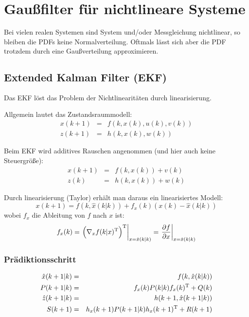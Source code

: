 \chapter{Gaußfilter für nichtlineare Systeme}
Bei vielen realen Systemen sind System und/oder Messgleichung nichtlinear, so bleiben die PDFs keine Normalverteilung. Oftmals lässt sich aber die PDF trotzdem durch eine Gaußverteilung
approximieren.

\section{Extended Kalman Filter (EKF)}
Das EKF löst das Problem der Nichtlinearitäten durch linearisierung.

Allgemein lautet das Zustandsraummodell:
\begin{eqnarray*}
    x(k+1) &=& f(k, x(k), u(k), v(k)) \\
    z(k+1) &=& h(k, x(k), w(k))
\end{eqnarray*}

Beim EKF wird additives Rauschen angenommen (und hier auch keine Steuergröße):
\begin{eqnarray*}
    x(k+1) &=& f(k, x(k)) + v(k) \\
    z(k) &=& h(k, x(k)) + w(k)
\end{eqnarray*}

Durch linearisierung (Taylor) erhält man daraus ein linearisiertes Modell:
\begin{equation*}
    x(k+1) = f(k, \hat{x}(k|k)) + f_x(k) (x(k) - \hat{x}(k|k))
\end{equation*}
wobei $f_x$ die Ableitung von $f$ nach $x$ ist:
\begin{equation*}
    f_x(k) = \left. \left( \nabla_x f(k|x)^\text{T} \right)^\text{T} \right|_{x=\hat{x}(k|k)}
        = \left. \frac{\partial f}{\partial x} \right|_{x=\hat{x}(k|k)}
\end{equation*}

\subsection{Prädiktionsschritt}
\begin{eqnarray*}
    \hat{x}(k+1|k) &=& f(k, \hat{x}(k|k)) \\
    P(k+1|k) &=& f_x(k) P(k|k) f_x(k)^\text{T} + Q(k) \\
    \hat{z}(k+1|k) &=& h(k+1, \hat{x}(k+1|k)) \\
    S(k+1) &=& h_x(k+1) P(k+1|k) h_x(k+1)^\text{T} + R(k+1)
\end{eqnarray*}

